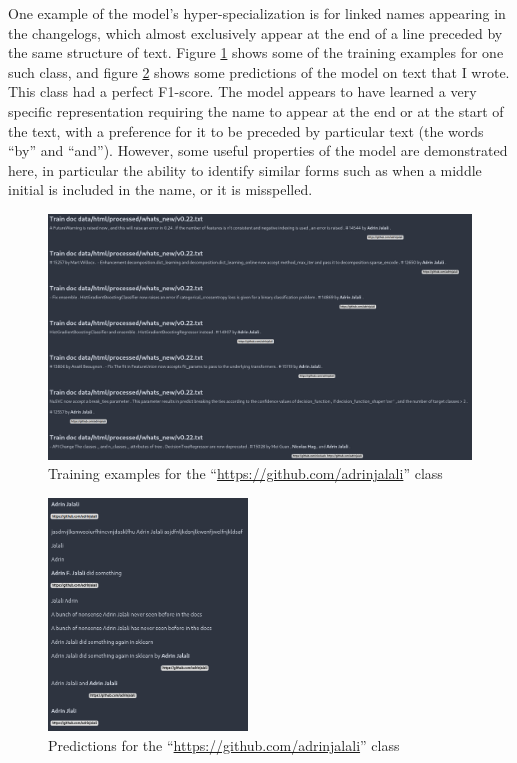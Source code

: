 \documentclass[manuscript,screen,review]{acmart}
\begin{document}
One example of the model's hyper-specialization is for linked names
appearing in the changelogs, which almost exclusively appear at the
end of a line preceded by the same structure of text. Figure
\ref{fig:org7fd03e7} shows some of the training examples for one
such class, and figure \ref{fig:orgfd674a1} shows some predictions
of the model on text that I wrote. This class had a perfect
F1-score. The model appears to have learned a very specific
representation requiring the name to appear at the end or at the start
of the text, with a preference for it to be preceded by particular
text (the words ``by'' and ``and''). However, some useful properties of
the model are demonstrated here, in particular the ability to identify
similar forms such as when a middle initial is included in the name,
or it is misspelled.

\begin{figure}[htbp]
\centering
\includegraphics[width=450px]{screenshots/Writeup/2023-04-13_20-57-13_screenshot.png}
\caption{\label{fig:org7fd03e7}Training examples for the ``\url{https://github.com/adrinjalali}'' class}
\end{figure}

\begin{figure}[htbp]
\centering
\includegraphics[width=200px]{screenshots/Writeup/2023-04-13_20-58-27_screenshot.png}
\caption{\label{fig:orgfd674a1}Predictions for the ``\url{https://github.com/adrinjalali}'' class}
\end{figure}
\end{document}
